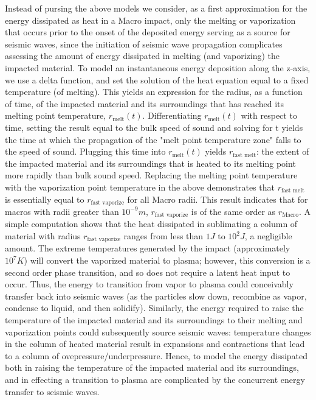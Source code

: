 \documentclass[prd,reprint,10pt]{revtex4-1}
\newcommand*\te[1]{\text{#1}}
\begin{document}
\par Instead of pursing the above models we consider, as a first approximation for the energy dissipated as heat in a Macro impact, only the melting or vaporization that occurs prior to the onset of the deposited energy serving as a source for seismic waves, since the initiation of seismic wave propagation complicates assessing the amount of energy dissipated in melting (and vaporizing) the impacted material.  To model an instantaneous energy deposition along the z-axis, we use a delta function, and set the solution of the heat equation equal to a fixed temperature (of melting). This yields an expression for the radius, as a function of time, of the impacted material and its surroundings that has reached its melting point temperature, $r_\te{melt}(t)$.  Differentiating $r_\te{melt}(t)$ with respect to time, setting the result equal to the bulk speed of sound and solving for t yields the time at which the propagation of the "melt point temperature zone" falls to the speed of sound.  Plugging this time into $r_\te{melt}(t)$ yields $r_\te{fast melt}$: the extent of the impacted material and its surroundings that is heated to its melting point more rapidly than bulk sound speed. Replacing the melting point temperature with the vaporization point temperature in the above demonstrates that $r_\te{fast melt}$ is essentially equal to $r_\te{fast vaporize}$ for all Macro radii.  This result indicates that for macros with radii greater than $10^{-9} m$, $r_\te{fast vaporize}$ is of the same order as $r_\te{Macro}$.  A simple computation shows that the heat dissipated in sublimating a column of material with radius $r_\te{fast vaporize}$ ranges from less than $1 J$ to $10^2 J$, a negligible amount.
The extreme temperatures generated by the impact (approximately $10^7 K$) will convert the vaporized material to plasma; however, this conversion is a second order phase transition, and so does not require a latent heat input to occur.  Thus, the energy to transition from vapor to plasma could conceivably transfer back into seismic waves (as the particles slow down, recombine as vapor, condense to liquid, and then solidify). Similarly, the energy required to raise the temperature of the impacted material and its surroundings to their melting and vaporization points could subsequently source seismic waves: temperature changes in the column of heated material result in expansions  and contractions that lead to a column of ovepressure/underpressure. Hence, to model the energy dissipated both in raising the temperature of the impacted material and its surroundings, and in effecting a transition to plasma are complicated by the concurrent energy transfer to seismic waves.
\end{document}
